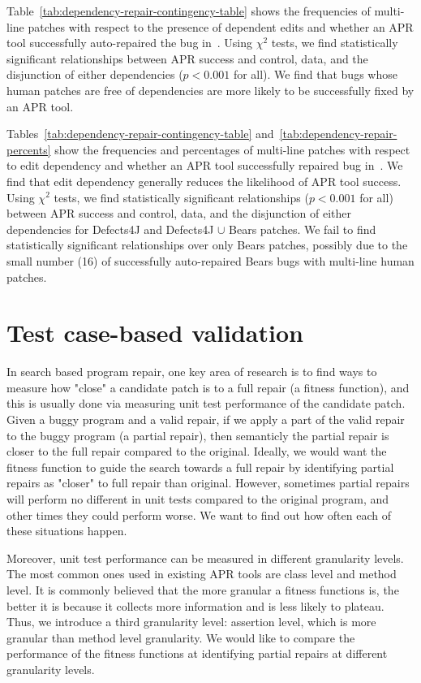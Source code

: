 \documentclass[sigconf, timestamp-false, anonymous=true]{acmart}
\begin{document}
Table~\ref{tab:dependency-repair-contingency-table} shows
the frequencies of multi-line patches with respect to the presence of 
dependent edits and whether an APR tool successfully auto-repaired the bug in~\cite{durieux-repair-them-all}.
Using $\chi^2$ tests, we find statistically significant relationships between APR  
success and control, data, and the disjunction of either dependencies 
($p < 0.001$ for all).
We find that bugs whose human patches are free of dependencies are
more likely to be successfully fixed by an APR tool.

Tables~\ref{tab:dependency-repair-contingency-table} and~\ref{tab:dependency-repair-percents}
show the frequencies and percentages of multi-line patches with respect to edit dependency 
and whether an APR tool successfully repaired bug in~\cite{durieux-repair-them-all}.
We find that edit dependency generally reduces the likelihood of APR tool success.
Using $\chi^2$ tests, we find statistically significant relationships ($p < 0.001$ for all)
between APR success and control, data, and the disjunction of either dependencies 
for Defects4J and Defects4J $\cup$ Bears patches. We fail to find statistically 
significant relationships over only Bears patches, possibly due to the small number (16) of 
successfully auto-repaired Bears bugs with multi-line human patches.


\section{Test case-based validation}

In search based program repair, one key area of research is to find ways to 
measure how "close" a candidate patch is to a full repair (a fitness function),
and this is usually done via measuring unit test performance of the candidate patch. 
Given a buggy program and a valid repair, if we apply a part of the valid repair to 
the buggy program (a partial repair), then semanticly the partial repair is closer
 to the full repair compared to the original. 
Ideally, we would want the fitness function to guide the search towards a full 
repair by identifying partial repairs as "closer" to full repair than original.
However, sometimes partial repairs will perform no different in unit tests compared 
to the original program, and other times they could perform worse. We want to find 
out how often each of these situations happen.

Moreover, unit test performance can be measured in different granularity levels. 
The most common ones used in existing APR tools are class level and method level. 
It is commonly believed that the more granular a fitness functions is, the better 
it is because it collects more information and is less likely to plateau. Thus, 
we introduce a third granularity level: assertion level, which is more granular 
than method level granularity.
We would like to compare the performance of the fitness functions at identifying 
partial repairs at different granularity levels.
\end{document}
